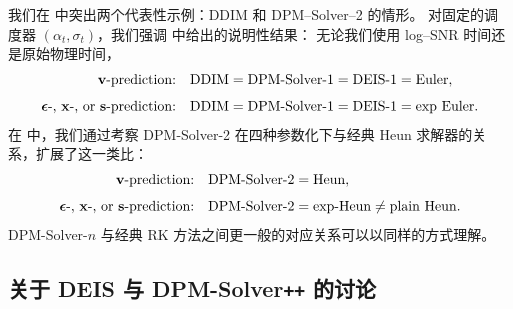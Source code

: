 我们在  中突出两个代表性示例：DDIM 和 DPM--Solver--2 的情形。
对固定的调度器 $(\alpha_t,\sigma_t)$，我们强调  中给出的说明性结果：
无论我们使用 log--SNR 时间还是原始物理时间，
\[
\begin{aligned}
\text{${\mathbf{v}}$-prediction:}\quad 
&\text{DDIM} = \text{DPM-Solver-1} = \text{DEIS-1} = \text{Euler}, \\[4pt]
\text{${\bm{\epsilon}}$-, ${\mathbf{x}}$-, or ${\mathbf{s}}$-prediction:}\quad 
&\text{DDIM} = \text{DPM-Solver-1} = \text{DEIS-1} = \text{exp Euler}.
\end{aligned}
\]
在  中，我们通过考察 DPM-Solver-2 在四种参数化下与经典 Heun 求解器的关系，扩展了这一类比：
\begin{align*}
\text{${\mathbf{v}}$-prediction:} 
&\quad \text{DPM-Solver-2} = \text{Heun}, \\[4pt]
\text{${\bm{\epsilon}}$-, ${\mathbf{x}}$-, or ${\mathbf{s}}$-prediction:} 
&\quad \text{DPM-Solver-2} = \text{exp-Heun} \neq \text{plain Heun}.
\end{align*}
DPM-Solver-$n$ 与经典 RK 方法之间更一般的对应关系可以以同样的方式理解。




\subsection{关于 DEIS 与 DPM-Solver\texttt{++} 的讨论}

